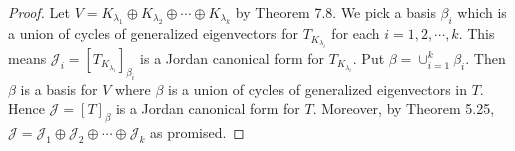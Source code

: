 \begin{Exercise}
	\begin{proof}
		Let $V = K_{\lambda_1}\oplus K_{\lambda_2} \oplus \cdots \oplus K_{\lambda_k}$ by Theorem 7.8. We pick a basis $\beta_i$ which is a union of cycles of generalized eigenvectors for $T_{K_{\lambda_i}}$ for each $i=1,2,\cdots,k$. This means $\mathcal{J}_i = [T_{K_{\lambda_i}}]_{\beta_i}$ is a Jordan canonical form for $T_{K_{\lambda_i}}$. Put $\beta = \cup_{i=1}^{k}\beta_i$. Then $\beta$ is a basis for $V$ where $\beta$ is a union of cycles of generalized eigenvectors in $T$. Hence $\mathcal{J} = [T]_{\beta}$ is a Jordan canonical form for $T$. Moreover, by Theorem 5.25, $\mathcal{J} = \mathcal{J}_1\oplus\mathcal{J}_2\oplus\cdots\oplus\mathcal{J}_k$ as promised.
	\end{proof}
\end{Exercise}